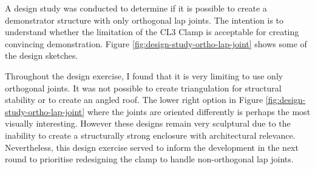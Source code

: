 A design study was conducted to determine if it is possible to create a demonstrator structure with only orthogonal lap joints. The intention is to understand whether the limitation of the CL3 Clamp is acceptable for creating convincing demonstration. Figure \ref{fig:design-study-ortho-lap-joint} shows some of the design sketches.  

Throughout the design exercise, I found that it is very limiting to use only orthogonal joints. It was not possible to create triangulation for structural stability or to create an angled roof. The lower right option in Figure \ref{fig:design-study-ortho-lap-joint} where the joints are oriented differently is perhaps the most visually interesting. However these designs remain very sculptural due to the inability to create a structurally strong enclosure with architectural relevance. Nevertheless, this design exercise served to inform the development in the next round  to prioritise redesigning the clamp to handle non-orthogonal lap joints.

